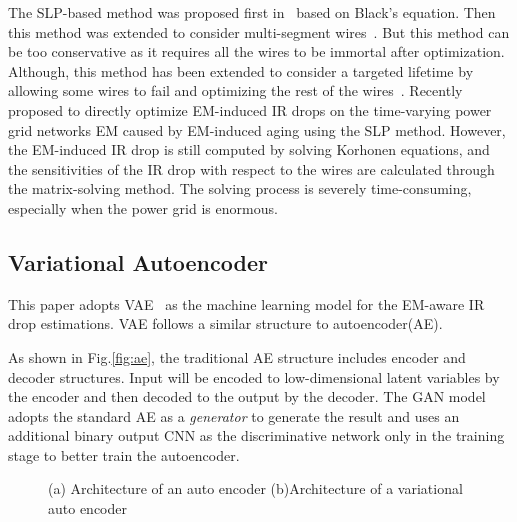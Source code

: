 The SLP-based method was proposed first in~\cite{Tan:DAC'99} based on Black's equation. Then this method was extended to consider multi-segment wires~\cite{ZhouSun:ASPDAC'18}. But this method can be too conservative as it requires all the wires to be immortal after optimization. Although, this method has been extended to consider a targeted lifetime by allowing some wires to fail and optimizing the rest of the wires~\cite{ZhouSun:TVLSI'19}.  Recently~\cite{Sukharev:2019pg} proposed to directly optimize EM-induced IR drops on the time-varying power grid networks EM caused by EM-induced aging using the SLP method. However, the EM-induced IR drop is still computed by solving Korhonen equations, and the sensitivities of the IR drop with respect to the wires are calculated through the matrix-solving method.  
The solving process is severely time-consuming, especially when the power grid is enormous.


\subsection{Variational Autoencoder}
\label{subsec:vae_intro}
This paper adopts VAE~\cite{Diederik:arxiv'22} as the machine learning model for the EM-aware IR drop estimations. 
VAE follows a similar structure to autoencoder(AE).

As shown in Fig.\ref{fig:ae}, the traditional AE structure includes encoder and decoder structures. Input will be encoded to low-dimensional latent variables by the encoder and then decoded to the output by the decoder.  
The GAN model adopts the standard AE as a \textit{generator} to generate the result and uses an additional binary output CNN as the discriminative network only in the training stage to better train the autoencoder. 


\begin{figure}[htp]
	\centering
	\caption{(a) Architecture of an auto encoder (b)Architecture of a variational auto encoder }
	\label{fig:compare_ae_vae}
\end{figure}


